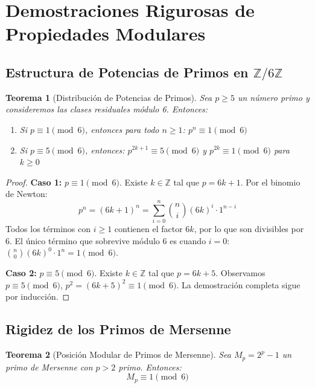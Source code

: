 \documentclass[12pt, a4paper]{article}
\theoremstyle{plain}
\newtheorem{teorema}{Teorema}[section]
\theoremstyle{definition}
\theoremstyle{remark}
\begin{document}
\section{Demostraciones Rigurosas de Propiedades Modulares}
\label{ap:demostraciones}

\subsection{Estructura de Potencias de Primos en \texorpdfstring{$\mathbb{Z}/6\mathbb{Z}$}{Z/6Z}}
\label{ap:estructura_potencias}

\begin{teorema}[Distribución de Potencias de Primos]
\label{teo:distribucion_potencias_primos}
Sea $p \geq 5$ un número primo y consideremos las clases residuales módulo 6. Entonces:
\begin{enumerate}
    \item Si $p \equiv 1 \pmod{6}$, entonces para todo $n \geq 1$: $p^n \equiv 1 \pmod{6}$
    \item Si $p \equiv 5 \pmod{6}$, entonces: $p^{2k+1} \equiv 5 \pmod{6}$ y $p^{2k} \equiv 1 \pmod{6}$ para $k \geq 0$
\end{enumerate}
\end{teorema}

\begin{proof}
\textbf{Caso 1:} $p \equiv 1 \pmod{6}$. Existe $k \in \mathbb{Z}$ tal que $p = 6k + 1$. Por el binomio de Newton:
\[
p^n = (6k + 1)^n = \sum_{i=0}^{n} \binom{n}{i} (6k)^i \cdot 1^{n-i}
\]
Todos los términos con $i \geq 1$ contienen el factor $6k$, por lo que son divisibles por 6. El único término que sobrevive módulo 6 es cuando $i = 0$: $\binom{n}{0} (6k)^0 \cdot 1^n = 1 \pmod{6}$.

\textbf{Caso 2:} $p \equiv 5 \pmod{6}$. Existe $k \in \mathbb{Z}$ tal que $p = 6k + 5$. Observamos $p \equiv 5 \pmod{6}$, $p^2 = (6k+5)^2 \equiv 1 \pmod{6}$. La demostración completa sigue por inducción.
\end{proof}

\subsection{Rigidez de los Primos de Mersenne}
\label{ap:mersenne}

\begin{teorema}[Posición Modular de Primos de Mersenne]
\label{teo:mersenne_mod_6}
Sea $M_p = 2^p - 1$ un primo de Mersenne con $p > 2$ primo. Entonces:
\[
M_p \equiv 1 \pmod{6}
\]
\end{teorema}
\end{document}
